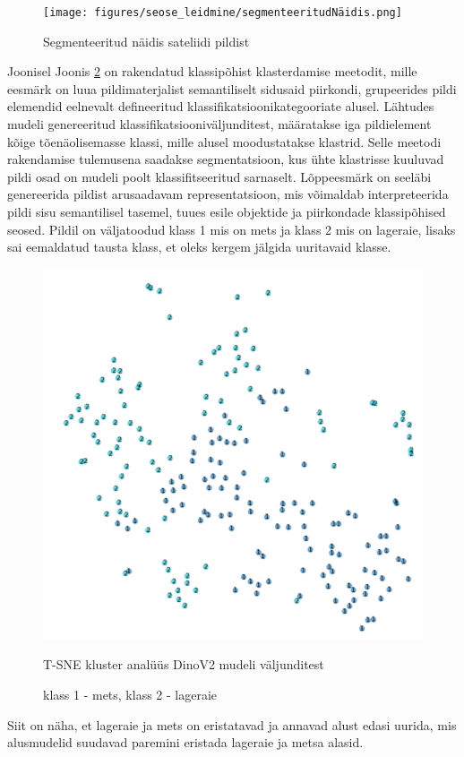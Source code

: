 \begin{figure}[H]
    \centering
    \texttt{[image: figures/seose\_leidmine/segmenteeritudNäidis.png]}
    \caption{Segmenteeritud näidis sateliidi pildist}
    \label{fig:segmenteeritudPealiskiht}
\end{figure}

Joonisel Joonis \ref{fig:tsneDinoPatchEmbedings} on rakendatud klassipõhist klasterdamise meetodit, mille eesmärk on luua
pildimaterjalist semantiliselt sidusaid piirkondi, grupeerides pildi elemendid
eelnevalt defineeritud klassifikatsioonikategooriate alusel. Lähtudes mudeli
genereeritud klassifikatsiooniväljunditest, määratakse iga pildielement kõige
tõenäolisemasse klassi, mille alusel moodustatakse klastrid. Selle meetodi
rakendamise tulemusena saadakse segmentatsioon, kus ühte klastrisse kuuluvad
pildi osad on mudeli poolt klassifitseeritud sarnaselt. Lõppeesmärk on seeläbi
genereerida pildist arusaadavam representatsioon, mis
võimaldab interpreteerida pildi sisu semantilisel tasemel, tuues
esile objektide ja piirkondade klassipõhised seosed. Pildil on väljatoodud klass 1 mis on mets ja klass 2 mis on lageraie, lisaks sai eemaldatud tausta klass, et oleks kergem jälgida uuritavaid klasse.

\begin{figure}[H]
    \centering
    \includegraphics[width=.7\textwidth]{figures/seose_leidmine/tsneDinoPatchEmbedings.png}
    \caption{T-SNE kluster analüüs DinoV2 mudeli väljunditest}
    \caption*{klass 1 - mets, klass 2 - lageraie}
    \label{fig:tsneDinoPatchEmbedings}
\end{figure}

Siit on näha, et lageraie ja mets on eristatavad ja annavad alust edasi uurida, mis alusmudelid suudavad paremini eristada lageraie ja metsa alasid.